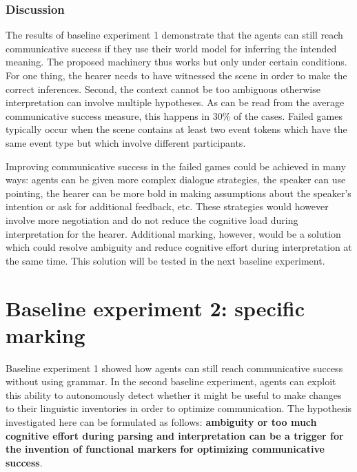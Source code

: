 \subsubsection{Discussion}
 The results of baseline experiment 1 demonstrate that the agents can still reach communicative success if they use their world model for inferring the intended meaning. The proposed machinery thus works but only under certain conditions. For one thing, the hearer needs to have witnessed the scene in order to make the correct inferences. Second, the context cannot be too ambiguous otherwise interpretation can involve multiple hypotheses. As can be read from the average communicative success measure, this happens in 30\% of the cases. Failed games typically occur when the scene contains at least two event tokens which have the same event type but which involve different participants.

Improving communicative success in the failed games could be achieved in many ways: agents can be given more complex dialogue strategies, the speaker can use pointing, the hearer can be more bold in making assumptions about the speaker's intention or ask for additional feedback, etc. These strategies would however involve more negotiation and do not reduce the cognitive load during interpretation for the hearer. Additional marking, however, would be a solution which could resolve ambiguity and reduce cognitive effort during interpretation at the same time. This solution will be tested in the next baseline experiment.

\section{Baseline experiment 2: specific marking}
\label{s:base2}

Baseline experiment 1 showed how agents can still reach communicative success without using grammar. In the second baseline experiment, agents can exploit this ability to autonomously detect whether it might be useful to make changes to their linguistic inventories in order to optimize communication. The hypothesis investigated here can be formulated as follows: {\bfseries ambiguity or too much cognitive effort during parsing and interpretation can be a trigger for the invention of functional markers for optimizing communicative success}.

